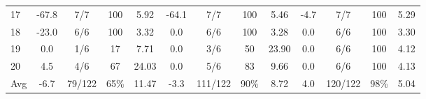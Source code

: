 \begin{table}[p]
{\begin{tabular}{l|cccc|cccc|cccc}
17 & -67.8 & 7/7 & 100 & 5.92 & -64.1 & 7/7 & 100 & 5.46 & -4.7 & 7/7 & 100 & 5.29 \\
18 & -23.0 & 6/6 & 100 & 3.32 & 0.0 & 6/6 & 100 & 3.28 & 0.0 & 6/6 & 100 & 3.30 \\
19 & 0.0 & 1/6 & 17 & 7.71 & 0.0 & 3/6 & 50 & 23.90 & 0.0 & 6/6 & 100 & 4.12 \\
20 & 4.5 & 4/6 & 67 & 24.03 & 0.0 & 5/6 & 83 & 9.66 & 0.0 & 6/6 & 100 & 4.13 \\
\midrule
Avg & -6.7 & 79/122 & 65\% & 11.47 & -3.3 & 111/122 & 90\% & 8.72 & 4.0 & 120/122 & 98\% & 5.04 \\
\bottomrule
\end{tabular}%
}
\end{table}
